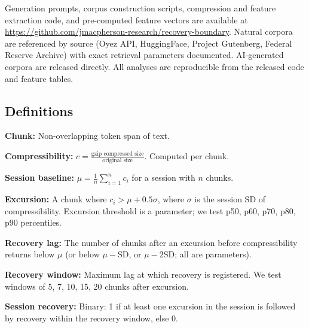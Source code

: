 \documentclass[final]{clv2025}
\begin{document}
Generation prompts, corpus construction scripts, compression and feature extraction code, and pre-computed feature vectors are available at \url{https://github.com/jmacpherson-research/recovery-boundary}. Natural corpora are referenced by source (Oyez API, HuggingFace, Project Gutenberg, Federal Reserve Archive) with exact retrieval parameters documented. AI-generated corpora are released directly. All analyses are reproducible from the released code and feature tables.





\FloatBarrier


\appendix


\subsection{Definitions}

\textbf{Chunk:} Non-overlapping \chunkTokens\-token span of text.

\textbf{Compressibility:} $c = \frac{\text{gzip compressed size}}{\text{original size}}$. Computed per chunk.

\textbf{Session baseline:} $\mu = \frac{1}{n} \sum_{i=1}^{n} c_i$ for a session with $n$ chunks.

\textbf{Excursion:} A chunk where $c_i > \mu + 0.5 \sigma$, where $\sigma$ is the session SD of compressibility. Excursion threshold is a parameter; we test p50, p60, p70, p80, p90 percentiles.

\textbf{Recovery lag:} The number of chunks after an excursion before compressibility returns below $\mu$ (or below $\mu - \text{SD}$, or $\mu - 2\text{SD}$; all are parameters).

\textbf{Recovery window:} Maximum lag at which recovery is registered. We test windows of 5, 7, 10, 15, 20 chunks after excursion.

\textbf{Session recovery:} Binary: 1 if at least one excursion in the session is followed by recovery within the recovery window, else 0.
\end{document}
